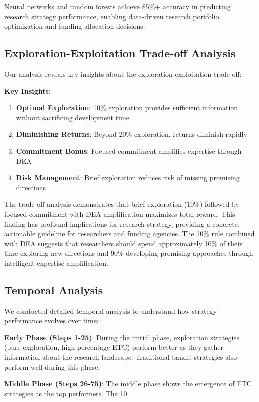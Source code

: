 \documentclass[letterpaper]{article} %
\begin{document}
Neural networks and random forests achieve 85\%+ accuracy in predicting research strategy performance, enabling data-driven research portfolio optimization and funding allocation decisions.

\subsection{Exploration-Exploitation Trade-off Analysis}

Our analysis reveals key insights about the exploration-exploitation trade-off:

\textbf{Key Insights:}
\begin{enumerate}
\item \textbf{Optimal Exploration}: 10\% exploration provides sufficient information without sacrificing development time
\item \textbf{Diminishing Returns}: Beyond 20\% exploration, returns diminish rapidly
\item \textbf{Commitment Bonus}: Focused commitment amplifies expertise through DEA
\item \textbf{Risk Management}: Brief exploration reduces risk of missing promising directions
\end{enumerate}

The trade-off analysis demonstrates that brief exploration (10\%) followed by focused commitment with DEA amplification maximizes total reward. This finding has profound implications for research strategy, providing a concrete, actionable guideline for researchers and funding agencies. The 10\% rule combined with DEA suggests that researchers should spend approximately 10\% of their time exploring new directions and 90\% developing promising approaches through intelligent expertise amplification.

\subsection{Temporal Analysis}

We conducted detailed temporal analysis to understand how strategy performance evolves over time:

\textbf{Early Phase (Steps 1-25)}: During the initial phase, exploration strategies (pure exploration, high-percentage ETC) perform better as they gather information about the research landscape. Traditional bandit strategies also perform well during this phase.

\textbf{Middle Phase (Steps 26-75)}: The middle phase shows the emergence of ETC strategies as the top performers. The 10%
\end{document}
